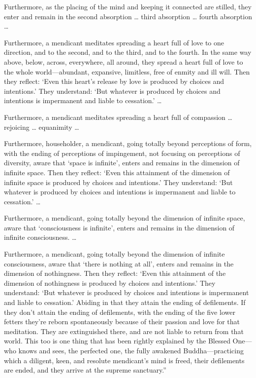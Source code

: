 \documentclass[12pt,openany]{book}%
\begin{document}
Furthermore, as the placing of the mind and keeping it connected are stilled, they enter and remain in the second absorption … third absorption … fourth absorption … 

Furthermore, a mendicant meditates spreading a heart full of love to one direction, and to the second, and to the third, and to the fourth. In the same way above, below, across, everywhere, all around, they spread a heart full of love to the whole world—abundant, expansive, limitless, free of enmity and ill will. Then they reflect: ‘Even this heart’s release by love is produced by choices and intentions.’ They understand: ‘But whatever is produced by choices and intentions is impermanent and liable to cessation.’ … 

Furthermore, a mendicant meditates spreading a heart full of compassion … rejoicing … equanimity … 

Furthermore, householder, a mendicant, going totally beyond perceptions of form, with the ending of perceptions of impingement, not focusing on perceptions of diversity, aware that ‘space is infinite’, enters and remains in the dimension of infinite space. Then they reflect: ‘Even this attainment of the dimension of infinite space is produced by choices and intentions.’ They understand: ‘But whatever is produced by choices and intentions is impermanent and liable to cessation.’ … 

Furthermore, a mendicant, going totally beyond the dimension of infinite space, aware that ‘consciousness is infinite’, enters and remains in the dimension of infinite consciousness. … 

Furthermore, a mendicant, going totally beyond the dimension of infinite consciousness, aware that ‘there is nothing at all’, enters and remains in the dimension of nothingness. Then they reflect: ‘Even this attainment of the dimension of nothingness is produced by choices and intentions.’ They understand: ‘But whatever is produced by choices and intentions is impermanent and liable to cessation.’ Abiding in that they attain the ending of defilements. If they don’t attain the ending of defilements, with the ending of the five lower fetters they’re reborn spontaneously because of their passion and love for that meditation. They are extinguished there, and are not liable to return from that world. This too is one thing that has been rightly explained by the Blessed One—who knows and sees, the perfected one, the fully awakened Buddha—practicing which a diligent, keen, and resolute mendicant’s mind is freed, their defilements are ended, and they arrive at the supreme sanctuary.” 
\end{document}
